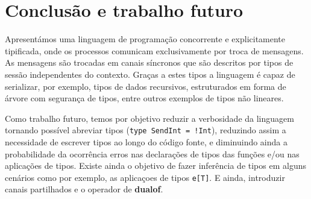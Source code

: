 \section{Conclusão e trabalho futuro}
\lstset{language=CFST, style=eclipse}
Apresentámos uma linguagem de programação concorrente e explicitamente tipificada, onde os processos comunicam exclusivamente por troca de mensagens. As mensagens são trocadas em canais síncronos que são descritos por tipos de sessão independentes do contexto. Graças a estes tipos a linguagem é capaz de serializar, por exemplo, tipos de dados recursivos, estruturados em forma de árvore com segurança de tipos, entre outros exemplos de tipos não lineares.

Como trabalho futuro, temos por objetivo reduzir a verbosidade da linguagem tornando possível abreviar tipos (\lstinline{type SendInt = !Int}), reduzindo assim a necessidade de escrever tipos ao longo do código fonte, e diminuindo ainda a probabilidade da ocorrência erros nas declarações de tipos das funções e/ou nas aplicações de tipos.
Existe ainda o objetivo de fazer inferência de tipos em alguns cenários como por exemplo, as aplicaçoes de tipos \lstinline|e[T]|. E ainda, introduzir canais partilhados e o operador de \textbf{dualof}.
 

